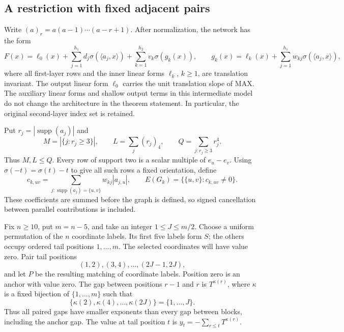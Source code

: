 
\subsection{A restriction with fixed adjacent pairs}

Write $(a)_r=a(a-1)\cdots(a-r+1)$. After normalization, the network has the
form
\begin{equation}\label{eq:fixed-pair-model}
 F(x)=\ell_0(x)+\sum_{j=1}^{h_1}d_j\sigma(\langle a_j,x\rangle)
             +\sum_{k=1}^{h_2}v_k\sigma(g_k(x)),
 \qquad
 g_k(x)=\ell_k(x)+\sum_{j=1}^{h_1}w_{kj}\sigma(\langle a_j,x\rangle),
\end{equation}
where all first-layer rows and the inner linear forms $\ell_k$, $k\ge1$,
are translation invariant. The output linear form $\ell_0$ carries the
unit translation slope of MAX. The auxiliary linear forms and shallow
output terms in this intermediate model do not change the architecture
in the theorem statement. In particular, the original second-layer index
set is retained.

Put $r_j=|\operatorname{supp}(a_j)|$ and
\[
 M=|\{j:r_j\ge3\}|,
 \qquad L=\sum_j(r_j)_4,
 \qquad Q=\sum_{j:r_j\ge3}r_j^4.
\]
Thus $M,L\le Q$. Every row of support two is a scalar multiple of
$e_u-e_v$. Using $\sigma(-t)=\sigma(t)-t$ to give all such rows a fixed
orientation, define
\[
 c_{k,uv}=\sum_{j:\operatorname{supp}(a_j)=\{u,v\}}
                  w_{kj}|a_{j,u}|,
 \qquad
 E(G_k)=\{\{u,v\}:c_{k,uv}\ne0\}.
\]
These coefficients are summed before the graph is defined, so signed
cancellation between parallel contributions is included.

Fix $n\ge10$, put $m=n-5$, and take an integer $1\le J\le m/2$.
Choose a uniform permutation of the $n$ coordinate labels. Its first five
labels form $S$; the others occupy ordered tail positions $1,\ldots,m$.
The selected coordinates will have value zero. Pair tail positions
\[
 (1,2),(3,4),\ldots,(2J-1,2J),
\]
and let $P$ be the resulting matching of coordinate labels. Position zero
is an anchor with value zero. The gap between positions $r-1$ and $r$ is
$T^{\kappa(r)}$, where $\kappa$ is a fixed bijection of $\{1,\ldots,m\}$
such that
\[
 \{\kappa(2),\kappa(4),\ldots,\kappa(2J)\}=\{1,\ldots,J\}.
\]
Thus all paired gaps have smaller exponents than every gap between blocks,
including the anchor gap. The value at tail position $t$ is
$y_t=-\sum_{r\le t}T^{\kappa(r)}$.


